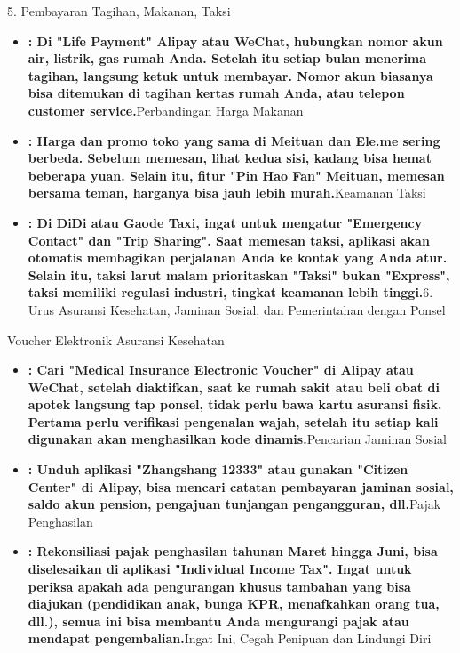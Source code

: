 5. Pembayaran Tagihan, Makanan, Taksi


\begin{itemize}
  \item \textbf{: Di "Life Payment" Alipay atau WeChat, hubungkan nomor akun air, listrik, gas rumah Anda. Setelah itu setiap bulan menerima tagihan, langsung ketuk untuk membayar. Nomor akun biasanya bisa ditemukan di tagihan kertas rumah Anda, atau telepon customer service.}Perbandingan Harga Makanan
  \item \textbf{: Harga dan promo toko yang sama di Meituan dan Ele.me sering berbeda. Sebelum memesan, lihat kedua sisi, kadang bisa hemat beberapa yuan. Selain itu, fitur "Pin Hao Fan" Meituan, memesan bersama teman, harganya bisa jauh lebih murah.}Keamanan Taksi
  \item \textbf{: Di DiDi atau Gaode Taxi, ingat untuk mengatur "Emergency Contact" dan "Trip Sharing". Saat memesan taksi, aplikasi akan otomatis membagikan perjalanan Anda ke kontak yang Anda atur. Selain itu, taksi larut malam prioritaskan "Taksi" bukan "Express", taksi memiliki regulasi industri, tingkat keamanan lebih tinggi.}6. Urus Asuransi Kesehatan, Jaminan Sosial, dan Pemerintahan dengan Ponsel
\end{itemize}


Voucher Elektronik Asuransi Kesehatan

\begin{itemize}
  \item \textbf{: Cari "Medical Insurance Electronic Voucher" di Alipay atau WeChat, setelah diaktifkan, saat ke rumah sakit atau beli obat di apotek langsung tap ponsel, tidak perlu bawa kartu asuransi fisik. Pertama perlu verifikasi pengenalan wajah, setelah itu setiap kali digunakan akan menghasilkan kode dinamis.}Pencarian Jaminan Sosial
  \item \textbf{: Unduh aplikasi "Zhangshang 12333" atau gunakan "Citizen Center" di Alipay, bisa mencari catatan pembayaran jaminan sosial, saldo akun pension, pengajuan tunjangan pengangguran, dll.}Pajak Penghasilan
  \item \textbf{: Rekonsiliasi pajak penghasilan tahunan Maret hingga Juni, bisa diselesaikan di aplikasi "Individual Income Tax". Ingat untuk periksa apakah ada pengurangan khusus tambahan yang bisa diajukan (pendidikan anak, bunga KPR, menafkahkan orang tua, dll.), semua ini bisa membantu Anda mengurangi pajak atau mendapat pengembalian.}Ingat Ini, Cegah Penipuan dan Lindungi Diri
\end{itemize}

